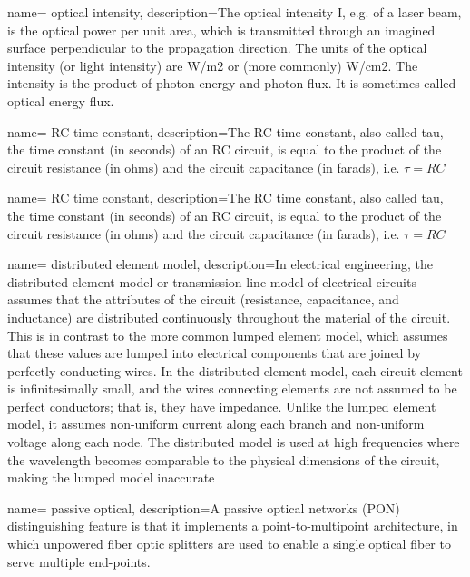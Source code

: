 {
        name= optical intensity,
        description={The optical intensity I, e.g. of a laser beam, is the optical power per unit area, which is transmitted through an imagined surface perpendicular to the propagation direction. The units of the optical intensity (or light intensity) are W/m2 or (more commonly) W/cm2. The intensity is the product of photon energy and photon flux. It is sometimes called optical energy flux.}
}

{
        name= RC time constant,
        description={The RC time constant, also called tau, the time constant (in seconds) of an RC circuit, is equal to the product of the circuit resistance (in ohms) and the circuit capacitance (in farads), i.e. $\tau = RC$}
}

{
        name= RC time constant,
        description={The RC time constant, also called tau, the time constant (in seconds) of an RC circuit, is equal to the product of the circuit resistance (in ohms) and the circuit capacitance (in farads), i.e. $\tau = RC$}
}

{
        name= distributed element model,
        description={In electrical engineering, the distributed element model or transmission line model of electrical circuits assumes that the attributes of the circuit (resistance, capacitance, and inductance) are distributed continuously throughout the material of the circuit. This is in contrast to the more common lumped element model, which assumes that these values are lumped into electrical components that are joined by perfectly conducting wires. In the distributed element model, each circuit element is infinitesimally small, and the wires connecting elements are not assumed to be perfect conductors; that is, they have impedance. Unlike the lumped element model, it assumes non-uniform current along each branch and non-uniform voltage along each node. The distributed model is used at high frequencies where the wavelength becomes comparable to the physical dimensions of the circuit, making the lumped model inaccurate}
}



{
        name= passive optical,
        description={A passive optical networks (PON) distinguishing feature is that it implements a point-to-multipoint architecture, in which unpowered fiber optic splitters are used to enable a single optical fiber to serve multiple end-points.}
}

